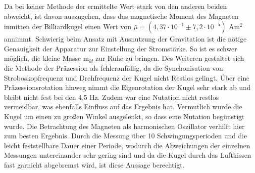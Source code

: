 Da bei keiner Methode der ermittelte Wert stark von den anderen beiden abweicht, ist davon auszugehen, dass das magnetische
Moment des Magneten inmitten der Billiardkugel einen Wert von $\bar \mu = (4,37 \cdot 10^{-1} \pm 7,2 \cdot 10^{-5})$ Am$^2$ annimmt. Schwierig beim Ansatz mit Ausnutzung der
Gravitation ist die nötige Genauigkeit der Apparatur zur Einstellung der Stromstärke. So ist es schwer möglich, die kleine Masse m$_{kl}$
zur Ruhe zu bringen. Des Weiteren gestaltet sich die Methode der Präzession als fehleranfällig, da die Synchonisation von Stroboskopfrequenz
und Drehfrequenz der Kugel nicht Restlos gelingt. Über eine Präzessionsrotation hinweg nimmt die Eigenrotation der Kugel sehr stark ab und bleibt nicht fest bei den 4,5 Hz. Zudem war eine Nutation nicht restlos vermeidbar, was ebenfalls Einfluss auf das Ergebnis hat. 
Vermutlich wurde die Kugel um einen zu großen Winkel ausgelenkt, so dass eine Nutation begünstigt wurde. Die Betrachtung des Magneten als
harmonischen Oszillator verhilft hier zum besten Ergebnis. Durch die Messung über 10 Schwingungsperioden und die leicht feststellbare Dauer
einer Periode, wodurch die Abweichungen der einzelnen Messungen untereinander sehr gering sind und da die Kugel durch das Luftkissen fast garnicht abgebremst wird,
 ist diese Aussage berechtigt.







